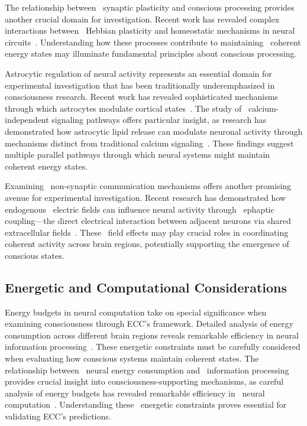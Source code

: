 The relationship between~ synaptic plasticity and conscious processing provides another crucial domain for investigation. Recent work has revealed complex interactions between~ Hebbian plasticity and homeostatic mechanisms in neural circuits~\cite{Turrigiano2017, Bicknell2021}. Understanding how these processes contribute to maintaining~ coherent energy states may illuminate fundamental principles about conscious processing.

 Astrocytic regulation of neural activity represents an essential domain for experimental investigation that has been traditionally underemphasized in consciousness research. Recent work has revealed sophisticated mechanisms through which astrocytes modulate cortical states~\cite{Poskanzer2016, pellerin2004neuroenergetics}. The study of~ calcium-independent signaling pathways offers particular insight, as research has demonstrated how astrocytic lipid release can modulate neuronal activity through mechanisms distinct from traditional calcium signaling~\cite{Chow2020}. These findings suggest multiple parallel pathways through which neural systems might maintain~ coherent energy states.

Examining~ non-synaptic communication mechanisms offers another promising avenue for experimental investigation. Recent research has demonstrated how endogenous~ electric fields can influence neural activity through~ ephaptic coupling—the direct electrical interaction between adjacent neurons via shared extracellular fields~\cite{anastassiou2015ephaptic, chiang2019slow}. These~ field effects may play crucial roles in coordinating coherent activity across brain regions, potentially supporting the emergence of conscious states.

\subsection*{Energetic and Computational Considerations}

 Energy budgets in neural computation take on special significance when examining consciousness through ECC's framework. Detailed analysis of energy consumption across different brain regions reveals remarkable efficiency in neural information processing~\cite{Bezaires2013, bullmore2012economy}. These energetic constraints must be carefully considered when evaluating how conscious systems maintain coherent states. The relationship between~ neural energy consumption and~ information processing provides crucial insight into consciousness-supporting mechanisms, as careful analysis of energy budgets has revealed remarkable efficiency in~ neural computation~\cite{Howarth2012}. Understanding these~ energetic constraints proves essential for validating ECC's predictions.

